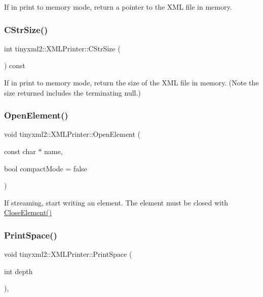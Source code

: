If in print to memory mode, return a pointer to the X\+ML file in memory. \mbox{\label{classtinyxml2_1_1_x_m_l_printer_a3256cf3523d4898b91abb18b924be04c}} 
\subsubsection{\texorpdfstring{CStrSize()}{CStrSize()}}
{\footnotesize\ttfamily int tinyxml2\+::\+X\+M\+L\+Printer\+::\+C\+Str\+Size (\begin{DoxyParamCaption}{ }\end{DoxyParamCaption}) const\hspace{0.3cm}{\ttfamily [inline]}}

If in print to memory mode, return the size of the X\+ML file in memory. (Note the size returned includes the terminating null.) \mbox{\label{classtinyxml2_1_1_x_m_l_printer_a20fb06c83bd13e5140d7dd13af06c010}} 
\subsubsection{\texorpdfstring{OpenElement()}{OpenElement()}}
{\footnotesize\ttfamily void tinyxml2\+::\+X\+M\+L\+Printer\+::\+Open\+Element (\begin{DoxyParamCaption}\item[{const char $\ast$}]{name,  }\item[{bool}]{compact\+Mode = {\ttfamily false} }\end{DoxyParamCaption})}

If streaming, start writing an element. The element must be closed with \mbox{\hyperlink{classtinyxml2_1_1_x_m_l_printer_af1fb439e5d800999646f333fa2f0699a}{Close\+Element()}} \mbox{\label{classtinyxml2_1_1_x_m_l_printer_a1c4b2ccbe4fdb316d54f5a93f3559260}} 
\subsubsection{\texorpdfstring{PrintSpace()}{PrintSpace()}}
{\footnotesize\ttfamily void tinyxml2\+::\+X\+M\+L\+Printer\+::\+Print\+Space (\begin{DoxyParamCaption}\item[{int}]{depth }\end{DoxyParamCaption})\hspace{0.3cm}{\ttfamily [protected]}, {\ttfamily [virtual]}}

